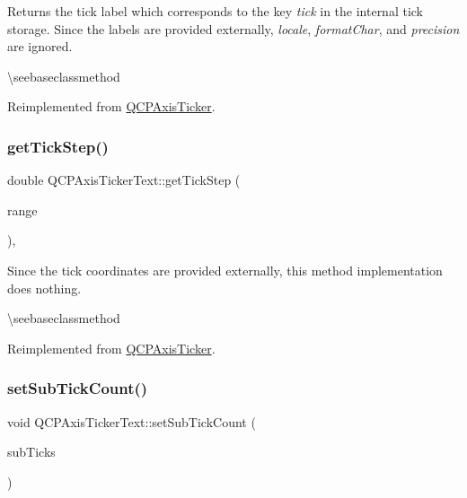 Returns the tick label which corresponds to the key {\itshape tick} in the internal tick storage. Since the labels are provided externally, {\itshape locale}, {\itshape format\+Char}, and {\itshape precision} are ignored.

\textbackslash{}seebaseclassmethod 

Reimplemented from \mbox{\hyperlink{class_q_c_p_axis_ticker_a8201eb4aa8be192bf786b126eb5ee089}{Q\+C\+P\+Axis\+Ticker}}.

\mbox{\label{class_q_c_p_axis_ticker_text_a628f16c41905e8c95c6622d6757a38c4}} 
\subsubsection{\texorpdfstring{getTickStep()}{getTickStep()}}
{\footnotesize\ttfamily double Q\+C\+P\+Axis\+Ticker\+Text\+::get\+Tick\+Step (\begin{DoxyParamCaption}\item[{const \mbox{\hyperlink{class_q_c_p_range}{Q\+C\+P\+Range}} \&}]{range }\end{DoxyParamCaption})\hspace{0.3cm}{\ttfamily [protected]}, {\ttfamily [virtual]}}

Since the tick coordinates are provided externally, this method implementation does nothing.

\textbackslash{}seebaseclassmethod 

Reimplemented from \mbox{\hyperlink{class_q_c_p_axis_ticker_a910d69bcec2de37e92d8d4e1ecf201e2}{Q\+C\+P\+Axis\+Ticker}}.

\mbox{\label{class_q_c_p_axis_ticker_text_a8cfa50c51183c90186892eeef978d571}} 
\subsubsection{\texorpdfstring{setSubTickCount()}{setSubTickCount()}}
{\footnotesize\ttfamily void Q\+C\+P\+Axis\+Ticker\+Text\+::set\+Sub\+Tick\+Count (\begin{DoxyParamCaption}\item[{int}]{sub\+Ticks }\end{DoxyParamCaption})}

